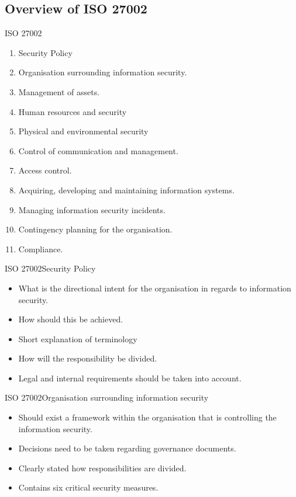 \documentclass{beamer}
\begin{document}
\subsection{Overview of ISO 27002}

\begin{frame}{ISO 27002}
  \begin{enumerate}
    \item Security Policy
    \item Organisation surrounding information security.
    \item Management of assets.
    \item Human resources and security
    \item Physical and environmental security
    \item Control of communication and management.
    \item Access control.
    \item Acquiring, developing and maintaining information systems.
    \item Managing information security incidents.
    \item Contingency planning for the organisation.
    \item Compliance.
  \end{enumerate}
\end{frame}

\begin{frame}{ISO 27002}{Security Policy}
  \begin{itemize}
    \item What is the directional intent for the organisation in regards to
      information security.
    \item How should this be achieved.
    \item Short explanation of terminology
    \item How will the responsibility be divided.
    \item Legal and internal requirements should be taken into account.
  \end{itemize}
\end{frame}

\begin{frame}{ISO 27002}{Organisation surrounding information security}
  \begin{itemize}
    \item Should exist a framework within the organisation that is controlling
      the information security.
    \item Decisions need to be taken regarding governance documents.
    \item Clearly stated how responsibilities are divided.
    \item Contains six critical security measures.
  \end{itemize}
\end{frame}
\end{document}
